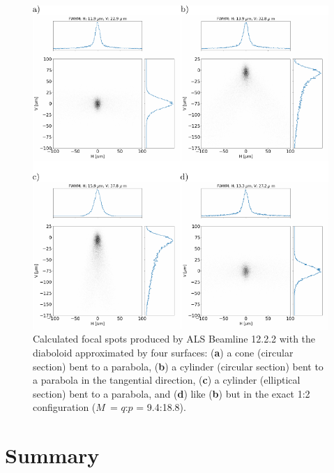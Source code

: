 \documentclass{iucr}       %
\begin{document}
\begin{figure}\label{fig:finalcomparison}
\includegraphics[width=1.0\textwidth]{figures/fig9.pdf}
% 


\caption{Calculated focal spots produced by ALS Beamline 12.2.2 with the diaboloid approximated by four surfaces: (\textbf{a}) a cone (circular section) bent to a parabola, (\textbf{b}) a cylinder (circular section) bent to a parabola in the tangential direction, (\textbf{c}) a cylinder (elliptical section) bent to a parabola, and (\textbf{d}) like (\textbf{b}) but in the exact 1:2 configuration ($M$~= $q$:$p$ = 9.4:18.8).}
\end{figure}

\section{Summary}
\label{sec:summary}
\end{document}
